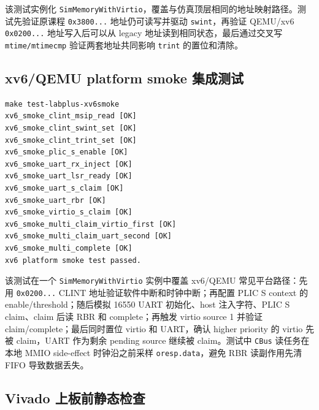 \documentclass[UTF8,a4paper,11pt]{ctexart}
\begin{document}
该测试实例化 \texttt{SimMemoryWithVirtio}，覆盖与仿真顶层相同的地址映射路径。测试先验证原课程 \texttt{0x3800...} 地址仍可读写并驱动 \texttt{swint}，再验证 QEMU/xv6 \texttt{0x0200...} 地址写入后可以从 legacy 地址读到相同状态，最后通过交叉写 \texttt{mtime/mtimecmp} 验证两套地址共同影响 \texttt{trint} 的置位和清除。

\subsection{xv6/QEMU platform smoke 集成测试}

\begin{Verbatim}[fontsize=\small]
make test-labplus-xv6smoke
xv6_smoke_clint_msip_read [OK]
xv6_smoke_clint_swint_set [OK]
xv6_smoke_clint_trint_set [OK]
xv6_smoke_plic_s_enable [OK]
xv6_smoke_uart_rx_inject [OK]
xv6_smoke_uart_lsr_ready [OK]
xv6_smoke_uart_s_claim [OK]
xv6_smoke_uart_rbr [OK]
xv6_smoke_virtio_s_claim [OK]
xv6_smoke_multi_claim_virtio_first [OK]
xv6_smoke_multi_claim_uart_second [OK]
xv6_smoke_multi_complete [OK]
xv6 platform smoke test passed.
\end{Verbatim}

该测试在一个 \texttt{SimMemoryWithVirtio} 实例中覆盖 xv6/QEMU 常见平台路径：先用 \texttt{0x0200...} CLINT 地址验证软件中断和时钟中断；再配置 PLIC S context 的 enable/threshold；随后模拟 16550 UART 初始化、host 注入字符、PLIC S claim、claim 后读 RBR 和 complete；再触发 virtio source 1 并验证 claim/complete；最后同时置位 virtio 和 UART，确认 higher priority 的 virtio 先被 claim，UART 作为剩余 pending source 继续被 claim。测试中 \texttt{CBus} 读任务在本地 MMIO side-effect 时钟沿之前采样 \texttt{oresp.data}，避免 RBR 读副作用先清 FIFO 导致数据丢失。

\subsection{Vivado 上板前静态检查}
\end{document}
